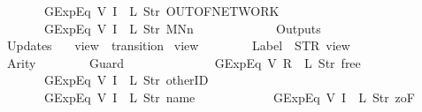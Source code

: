 \begin{isabellebody}
\ \ \ \ \ \ \ \ \ \ \ \ GExp{\isachardot}Eq\ {\isacharparenleft}V\ {\isacharparenleft}I\ {}{\isacharparenright}{\isacharparenright}\ {\isacharparenleft}L\ {\isacharparenleft}Str\ {\isacharprime}{\isacharprime}OUT{\isacharunderscore}OF{\isacharunderscore}NETWORK{\isacharprime}{\isacharprime}{\isacharparenright}{\isacharparenright}{\isacharcomma}\isanewline
\ \ \ \ \ \ \ \ \ \ \ \ GExp{\isachardot}Eq\ {\isacharparenleft}V\ {\isacharparenleft}I\ {}{\isacharparenright}{\isacharparenright}\ {\isacharparenleft}L\ {\isacharparenleft}Str\ {\isacharprime}{\isacharprime}MNn{}{\isacharprime}{\isacharprime}{\isacharparenright}{\isacharparenright}\isanewline
\ \ \ \ \ \ {\isacharbrackright}{\isacharcomma}\isanewline
\ \ \ \ \ \ Outputs\ {\isacharequal}\ {\isacharbrackleft}{\isacharbrackright}{\isacharcomma}\isanewline
\ \ \ \ \ \ Updates\ {\isacharequal}\ {\isacharbrackleft}{\isacharbrackright}\isanewline
{\isasymrparr}{\isachardoublequoteclose}\isanewline
\isanewline
{}\isamarkupfalse%
\ {\isachardoublequoteopen}view{}{\isachardoublequoteclose}\ {\isacharcolon}{\isacharcolon}\ {\isachardoublequoteopen}transition{\isachardoublequoteclose}\ \isanewline
{\isachardoublequoteopen}view{}\ {\isasymequiv}\ {\isasymlparr}\isanewline
\ \ \ \ \ \ Label\ {\isacharequal}\ STR\ {\isacharprime}{\isacharprime}view{\isacharprime}{\isacharprime}{\isacharcomma}\isanewline
\ \ \ \ \ \ Arity\ {\isacharequal}\ {}{\isacharcomma}\isanewline
\ \ \ \ \ \ Guard\ {\isacharequal}\ {\isacharbrackleft}\isanewline
\ \ \ \ \ \ \ \ \ \ \ \ GExp{\isachardot}Eq\ {\isacharparenleft}V\ {\isacharparenleft}R\ {}{\isacharparenright}{\isacharparenright}\ {\isacharparenleft}L\ {\isacharparenleft}Str\ {\isacharprime}{\isacharprime}free{\isacharprime}{\isacharprime}{\isacharparenright}{\isacharparenright}{\isacharcomma}\isanewline
\ \ \ \ \ \ \ \ \ \ \ \ GExp{\isachardot}Eq\ {\isacharparenleft}V\ {\isacharparenleft}I\ {}{\isacharparenright}{\isacharparenright}\ {\isacharparenleft}L\ {\isacharparenleft}Str\ {\isacharprime}{\isacharprime}otherID{\isacharprime}{\isacharprime}{\isacharparenright}{\isacharparenright}{\isacharcomma}\isanewline
\ \ \ \ \ \ \ \ \ \ \ \ GExp{\isachardot}Eq\ {\isacharparenleft}V\ {\isacharparenleft}I\ {}{\isacharparenright}{\isacharparenright}\ {\isacharparenleft}L\ {\isacharparenleft}Str\ {\isacharprime}{\isacharprime}name{\isacharprime}{\isacharprime}{\isacharparenright}{\isacharparenright}{\isacharcomma}\isanewline
\ \ \ \ \ \ \ \ \ \ \ \ GExp{\isachardot}Eq\ {\isacharparenleft}V\ {\isacharparenleft}I\ {}{\isacharparenright}{\isacharparenright}\ {\isacharparenleft}L\ {\isacharparenleft}Str\ {\isacharprime}{\isacharprime}{}zoF{\isacharprime}{\isacharprime}{\isacharparenright}{\isacharparenright}\isanewline

\end{isabellebody}
